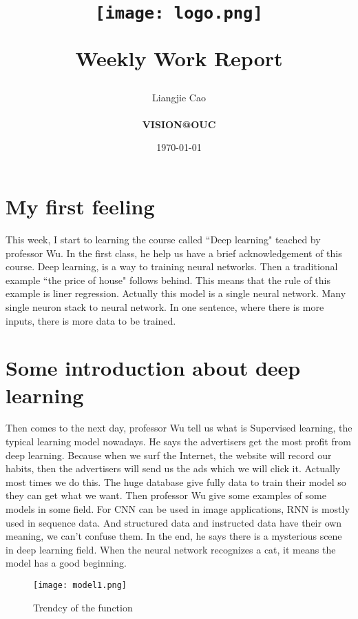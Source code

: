 \documentclass[a4paper]{article}
\begin{document}
 \title{\begin{figure}[htbp]
 \centering
 \texttt{[image: logo.png]}\\
 \end{figure}\textbf{Weekly Work Report}}
\author{Liangjie Cao \\
    \vspace*{0.5in} \\ 
    \textbf{VISION@OUC} \\
    \vspace*{1in}
}
\date{\today}
\maketitle
\newpage
\section{My first feeling}
\par This week, I start to learning the course called ``Deep learning" teached by professor Wu. In the first class, he help us have a brief acknowledgement of this course. Deep learning, is a way to training neural networks. Then a traditional example ``the price of house" follows behind. This means that the rule of this example is liner regression. Actually this model is a single neural network. Many single neuron stack to neural network. In one sentence, where there is more inputs, there is more data to be trained.
\section{Some introduction about deep learning}
Then comes to the next day, professor Wu tell us what is Supervised learning, the typical learning model nowadays. He says the advertisers get the most profit from deep learning. Because when we surf the Internet, the website will record our habits, then the advertisers will send us the ads which we will click it. Actually most times we do this. The huge database give fully data to train their model so they can get what we want. Then professor Wu give some examples of some models in some field. For CNN can be used in image applications, RNN is mostly used in sequence data. And structured data and instructed data have their own meaning, we can't confuse them. In the end, he says there is a mysterious scene in deep learning field. When the neural network recognizes a cat, it means the model has a good beginning.
 \begin{figure}[!htbp]
 \centering
 \texttt{[image: model1.png]}\\
 \caption{Trendcy of the function}\label{Figure1}
 \end{figure}
\end{document}
